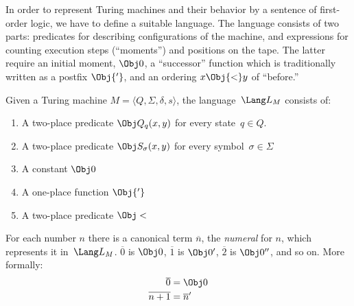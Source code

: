 \documentclass[../../include/open-logic-section]{subfiles}
\begin{document}

\begin{explain}
In order to represent Turing machines and their behavior by a sentence
of first-order logic, we have to define a suitable language. The
language consists of two parts: predicates for describing
configurations of the machine, and expressions for counting execution
steps (``moments'') and positions on the tape. The latter require an
initial moment, $\Obj 0$, a ``successor'' function which is
traditionally written as a postfix $\Obj{'}$, and an ordering $x
\Obj{<} y$ of ``before.''
\end{explain}

\begin{defn}
Given a Turing machine $M = \langle Q, \Sigma, \delta, s\rangle$, the
language~$\Lang L_M$ consists of:
\begin{enumerate}
\item A two-place predicate $\Obj Q_q(x, y)$ for every state~$q \in Q$.
\item A two-place predicate $\Obj S_\sigma(x, y)$ for every
  symbol~$\sigma\in \Sigma$
\item A constant $\Obj 0$
\item A one-place function $\Obj{'}$
\item A two-place predicate $\Obj <$
\end{enumerate}
\end{defn}

For each number $n$ there is a canonical term $\overline n$, the
\emph{numeral} for $n$, which represents it in~$\Lang L_M$. $\overline
0$ is $\Obj 0$, $\overline 1$ is $\Obj 0'$, $\overline 2$ is $\Obj
0''$, and so on. More formally:
\begin{align*}
\overline 0 & = \Obj 0 \\
\overline{n+1} &= \overline{n}'
\end{align*}
\end{document}

